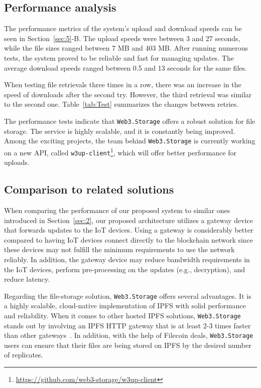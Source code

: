 \documentclass[conference]{IEEEtran}
\begin{document}
\subsection{Performance analysis}

The performance metrics of the system's upload and download speeds can be seen in Section~\ref{sec:5}-B. The upload speeds were between 3 and 27 seconds, while the file sizes ranged between 7 MB and 403 MB. After running numerous tests, the system proved to be reliable and fast for managing updates. The average download speeds ranged between 0.5 and 13 seconds for the same files. %

When testing file retrievals three times in a row, there was an increase in the speed of downloads after the second try. However, the third retrieval was similar to the second one. Table~\ref{tab:Test} summarizes the changes between retries.

The performance tests indicate that \texttt{Web3.Storage} offers a robust solution for file storage. The service is highly scalable, and it is constantly being improved. Among the exciting projects, the team behind \texttt{Web3.Storage} is currently working on a new API, called \texttt{w3up-client}\footnote{\url{https://github.com/web3-storage/w3up-client}}, which will offer better performance for uploads.

\subsection{Comparison to related solutions}

When comparing the performance of our proposed system to similar ones introduced in Section~\ref{sec:2}, our proposed architecture utilizes a gateway device that forwards updates to the IoT devices. Using a gateway is considerably better compared to having IoT devices connect directly to the blockchain network since these devices may not fulfill the minimum requirements to use the network reliably. In addition, the gateway device may reduce bandwidth requirements in the IoT devices, perform pre-processing on the updates (e.g., decryption), and reduce latency.

Regarding the file-storage solution, \texttt{Web3.Storage} offers several advantages. It is a highly scalable, cloud-native implementation of IPFS with solid performance and reliability. When it comes to other hosted IPFS solutions, \texttt{Web3.Storage} stands out by involving an IPFS HTTP gateway that is at least 2-3 times faster than other gateways~\cite{3perf}. In addition, with the help of Filecoin deals, \texttt{Web3.Storage} users can ensure that their files are being stored on IPFS by the desired number of replicates.
\end{document}
